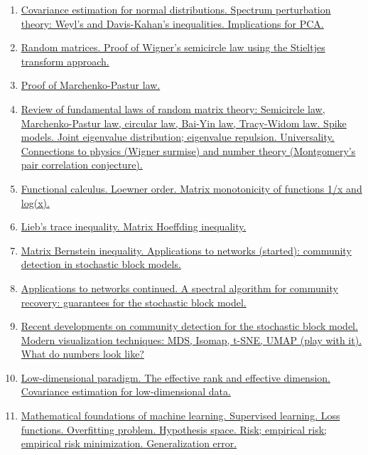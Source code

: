 \documentclass[11pt]{article}
\begin{document}
\begin{enumerate}
	\item \href{https://mp.weixin.qq.com/s/6uf0V9rMVBCDPtj__bgqCg}{Covariance estimation for normal distributions. Spectrum perturbation theory: Weyl's and Davis-Kahan's inequalities. Implications for PCA.}	%
	\item \href{https://mp.weixin.qq.com/s/O187r2CHDwH-JBTAUYmYGg}{Random matrices. Proof of Wigner's semicircle law using the Stieltjes transform approach.}	%
	\item \href{https://mp.weixin.qq.com/s/zXsQCJkJKh7L80m_fewK-A}{Proof of Marchenko-Pastur law.}	%
	\item \href{https://mp.weixin.qq.com/s/tzS0dL5qms4e7Ey8btcxWQ}{Review of fundamental laws of random matrix theory: Semicircle law, Marchenko-Pastur law, circular law, Bai-Yin law, Tracy-Widom law. Spike models. Joint eigenvalue distribution; eigenvalue repulsion. Universality. Connections to physics (Wigner surmise) and number theory (Montgomery's pair correlation conjecture).}	%
	\item \href{https://mp.weixin.qq.com/s/-e1xO5WgROKhGxua9JIGyA}{Functional calculus. Loewner order. Matrix monotonicity of functions 1/x and log(x).}	%
	\item \href{https://mp.weixin.qq.com/s/VXFW5a9NUc2LbC7-hO8gRQ}{Lieb's trace inequality. Matrix Hoeffding inequality.}	%
	\item \href{https://mp.weixin.qq.com/s/Xa7Wy2KIrUoLzbAl4NhCng}{Matrix Bernstein inequality. Applications to networks (started): community detection in stochastic block models.}	%
	\item \href{https://mp.weixin.qq.com/s/9ZYBZm9lU5aqYBvwXp0TdA}{Applications to networks continued. A spectral algorithm for community recovery: guarantees for the stochastic block model.}	%
	\item \href{https://mp.weixin.qq.com/s/rmWDzB1n6IFY-q5NXeNJLw}{Recent developments on community detection for the stochastic block model. Modern visualization techniques: MDS, Isomap, t-SNE, UMAP (play with it). What do numbers look like?}	%
	\item \href{https://mp.weixin.qq.com/s/WRNxpaSHdGWUHj3nAlhWJg}{Low-dimensional paradigm. The effective rank and effective dimension. Covariance estimation for low-dimensional data.}	%
	\item \href{https://mp.weixin.qq.com/s/RlMpTrjPe20Eh_-7mIigOw}{Mathematical foundations of machine learning. Supervised learning. Loss functions. Overfitting problem. Hypothesis space. Risk; empirical risk; empirical risk minimization. Generalization error.}	%

\end{enumerate}
\end{document}
